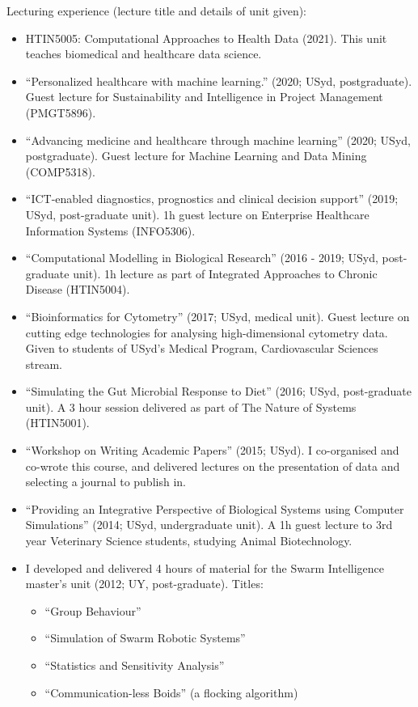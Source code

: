 \documentclass[a4paper]{article}
\begin{document}
Lecturing experience (lecture title and details of unit given):
\begin{itemize}
\item HTIN5005: Computational Approaches to Health Data (2021). This unit teaches biomedical and healthcare data science.
\item ``Personalized healthcare with machine learning.'' (2020; USyd, postgraduate). Guest lecture for Sustainability and Intelligence in Project Management (PMGT5896).
\item ``Advancing medicine and healthcare through machine learning'' (2020; USyd, postgraduate). Guest lecture for Machine Learning and Data Mining (COMP5318).
\item ``ICT-enabled diagnostics, prognostics and clinical decision support'' (2019; USyd, post-graduate unit). 1h guest lecture on Enterprise Healthcare Information Systems (INFO5306).
\item ``Computational Modelling in Biological Research'' (2016 - 2019; USyd, post-graduate unit). 1h lecture as part of Integrated Approaches to Chronic Disease (HTIN5004).
\item ``Bioinformatics for Cytometry'' (2017; USyd, medical unit). Guest lecture on cutting edge technologies for analysing high-dimensional cytometry data. Given to students of USyd's Medical Program, Cardiovascular Sciences stream.
\item ``Simulating the Gut Microbial Response to Diet'' (2016; USyd, post-graduate unit). A 3 hour session delivered as part of The Nature of Systems (HTIN5001).
\item ``Workshop on Writing Academic Papers'' (2015; USyd). I co-organised and co-wrote this course, and delivered lectures on the presentation of data and selecting a journal to publish in.
\item ``Providing an Integrative Perspective of Biological Systems using Computer Simulations'' (2014; USyd, undergraduate unit). A 1h guest lecture to 3rd year Veterinary Science students, studying Animal Biotechnology.

\item I developed and delivered 4 hours of material for the Swarm Intelligence master's unit (2012; UY, post-graduate). Titles:
 \begin{itemize}
  \item ``Group Behaviour''
  \item ``Simulation of Swarm Robotic Systems''
  \item ``Statistics and Sensitivity Analysis''
  \item ``Communication-less Boids'' (a flocking algorithm)
 \end{itemize}


\end{itemize}
\end{document}
